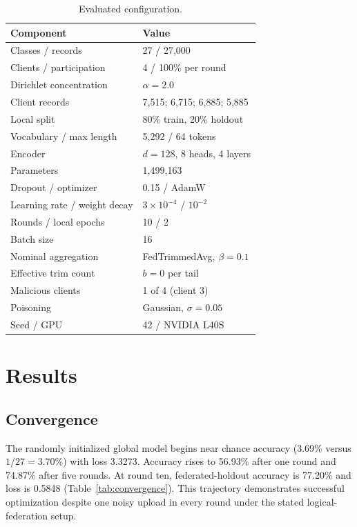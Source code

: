 \documentclass[journal]{IEEEtran}
\begin{document}
\begin{table}[t]
\centering
\caption{Evaluated configuration.}
\label{tab:configuration}
\begin{tabular}{ll}
\toprule
Component & Value \\
\midrule
Classes / records & 27 / 27,000 \\
Clients / participation & 4 / 100\% per round \\
Dirichlet concentration & $\alpha=2.0$ \\
Client records & 7,515; 6,715; 6,885; 5,885 \\
Local split & 80\% train, 20\% holdout \\
Vocabulary / max length & 5,292 / 64 tokens \\
Encoder & $d=128$, 8 heads, 4 layers \\
Parameters & 1,499,163 \\
Dropout / optimizer & 0.15 / AdamW \\
Learning rate / weight decay & $3\times10^{-4}$ / $10^{-2}$ \\
Rounds / local epochs & 10 / 2 \\
Batch size & 16 \\
Nominal aggregation & FedTrimmedAvg, $\beta=0.1$ \\
Effective trim count & $b=0$ per tail \\
Malicious clients & 1 of 4 (client 3) \\
Poisoning & Gaussian, $\sigma=0.05$ \\
Seed / GPU & 42 / NVIDIA L40S \\
\bottomrule
\end{tabular}
\end{table}

\section{Results}

\subsection{Convergence}
The randomly initialized global model begins near chance accuracy (3.69\% versus $1/27=3.70\%$) with loss 3.3273. Accuracy rises to 56.93\% after one round and 74.87\% after five rounds. At round ten, federated-holdout accuracy is 77.20\% and loss is 0.5848 (Table~\ref{tab:convergence}). This trajectory demonstrates successful optimization despite one noisy upload in every round under the stated logical-federation setup.
\end{document}
